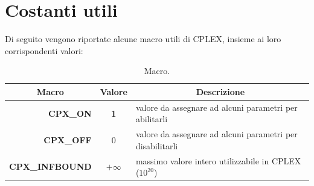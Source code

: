 \section{Costanti utili}
Di seguito vengono riportate alcune macro utili di CPLEX, insieme ai loro corrispondenti valori:
\begin{table}[h]
\footnotesize\centering
\begin{tabular}{rcl}
\hline
\multicolumn{1}{c}{\textbf{Macro}}&\multicolumn{1}{c}{\textbf{Valore}} &\multicolumn{1}{c}{\textbf{Descrizione}}\\
\hline
\textbf{CPX\_ON} & {\textbf{1}} & {valore da assegnare ad alcuni parametri per abilitarli}\\
\textbf{CPX\_OFF} & {0} & {valore da assegnare ad alcuni parametri per disabilitarli}\\
\textbf{CPX\_INFBOUND} & {$+\infty$ } & {massimo valore intero utilizzabile in CPLEX ($10^{20}$)}\\
\hline
\end{tabular}
\caption{Macro.}
\end{table}
